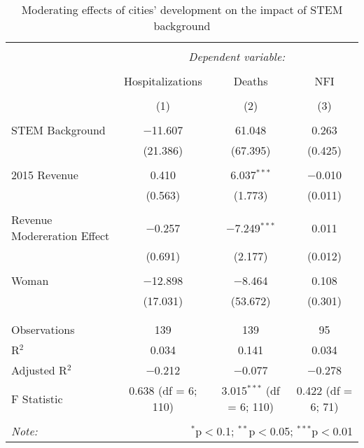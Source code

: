 
\begin{table}[!htbp] \centering 
  \caption{Moderating effects of cities’ development on the impact of STEM background} 
  \label{} 
\begin{tabular}{@{\extracolsep{5pt}}lccc} 
\\[-1.8ex]\hline 
\hline \\[-1.8ex] 
 & \multicolumn{3}{c}{\textit{Dependent variable:}} \\ 
\cline{2-4} 
\\[-1.8ex] & Hospitalizations & Deaths & NFI \\ 
\\[-1.8ex] & (1) & (2) & (3)\\ 
\hline \\[-1.8ex] 
 STEM Background & $-$11.607 & 61.048 & 0.263 \\ 
  & (21.386) & (67.395) & (0.425) \\ 
  & & & \\ 
 2015 Revenue & 0.410 & 6.037$^{***}$ & $-$0.010 \\ 
  & (0.563) & (1.773) & (0.011) \\ 
  & & & \\ 
 Revenue Modereration Effect & $-$0.257 & $-$7.249$^{***}$ & 0.011 \\ 
  & (0.691) & (2.177) & (0.012) \\ 
  & & & \\ 
 Woman & $-$12.898 & $-$8.464 & 0.108 \\ 
  & (17.031) & (53.672) & (0.301) \\ 
  & & & \\ 
\hline \\[-1.8ex] 
Observations & 139 & 139 & 95 \\ 
R$^{2}$ & 0.034 & 0.141 & 0.034 \\ 
Adjusted R$^{2}$ & $-$0.212 & $-$0.077 & $-$0.278 \\ 
F Statistic & 0.638 (df = 6; 110) & 3.015$^{***}$ (df = 6; 110) & 0.422 (df = 6; 71) \\ 
\hline 
\hline \\[-1.8ex] 
\textit{Note:}  & \multicolumn{3}{r}{$^{*}$p$<$0.1; $^{**}$p$<$0.05; $^{***}$p$<$0.01} \\ 
\end{tabular} 
\end{table} 
